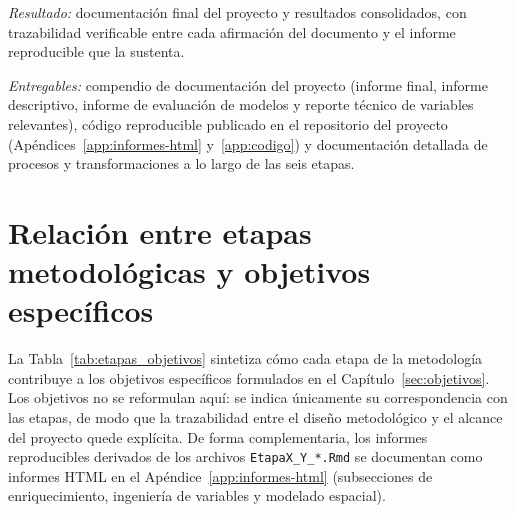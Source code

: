 \textit{Resultado:} documentación final del proyecto y resultados consolidados, con trazabilidad verificable entre cada afirmación del documento y el informe reproducible que la sustenta.

\textit{Entregables:} compendio de documentación del proyecto (informe final, informe descriptivo, informe de evaluación de modelos y reporte técnico de variables relevantes), código reproducible publicado en el repositorio del proyecto (Apéndices~\ref{app:informes-html} y~\ref{app:codigo}) y documentación detallada de procesos y transformaciones a lo largo de las seis etapas.
   

\section{Relación entre etapas metodológicas y objetivos específicos}
\label{sec:etapas_objetivos}

La Tabla~\ref{tab:etapas_objetivos} sintetiza cómo cada etapa de la metodología contribuye a los objetivos específicos formulados en el Capítulo~\ref{sec:objetivos}. Los objetivos no se reformulan aquí: se indica únicamente su correspondencia con las etapas, de modo que la trazabilidad entre el diseño metodológico y el alcance del proyecto quede explícita. De forma complementaria, los informes reproducibles derivados de los archivos \texttt{EtapaX\_Y\_*.Rmd} se documentan como informes HTML en el Apéndice~\ref{app:informes-html} (subsecciones de enriquecimiento, ingeniería de variables y modelado espacial).

